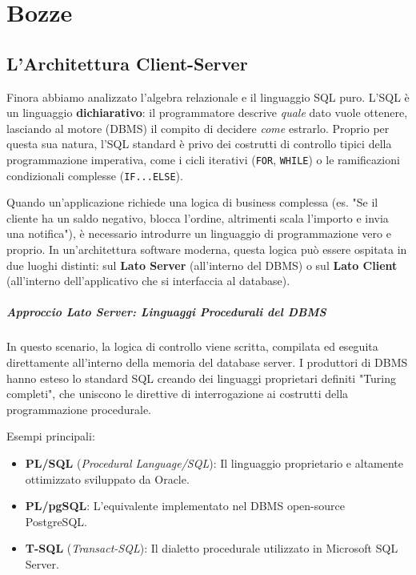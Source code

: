 \chapter{Bozze}

\section{L'Architettura Client-Server}

Finora abbiamo analizzato l'algebra relazionale e il linguaggio SQL puro. L'SQL è un linguaggio \textbf{dichiarativo}: il programmatore descrive \textit{quale} dato vuole ottenere, lasciando al motore (DBMS) il compito di decidere \textit{come} estrarlo. Proprio per questa sua natura, l'SQL standard è privo dei costrutti di controllo tipici della programmazione imperativa, come i cicli iterativi (\texttt{FOR}, \texttt{WHILE}) o le ramificazioni condizionali complesse (\texttt{IF...ELSE}).

Quando un'applicazione richiede una logica di business complessa (es. "Se il cliente ha un saldo negativo, blocca l'ordine, altrimenti scala l'importo e invia una notifica"), è necessario introdurre un linguaggio di programmazione vero e proprio. In un'architettura software moderna, questa logica può essere ospitata in due luoghi distinti: sul \textbf{Lato Server} (all'interno del DBMS) o sul \textbf{Lato Client} (all'interno dell'applicativo che si interfaccia al database).

\paragraph{Approccio Lato Server: Linguaggi Procedurali del DBMS}

In questo scenario, la logica di controllo viene scritta, compilata ed eseguita direttamente all'interno della memoria del database server. I produttori di DBMS hanno esteso lo standard SQL creando dei linguaggi proprietari definiti "Turing completi", che uniscono le direttive di interrogazione ai costrutti della programmazione procedurale.

Esempi principali:
\begin{itemize}
    \item \textbf{PL/SQL} (\textit{Procedural Language/SQL}): Il linguaggio proprietario e altamente ottimizzato sviluppato da Oracle.
    \item \textbf{PL/pgSQL}: L'equivalente implementato nel DBMS open-source PostgreSQL.
    \item \textbf{T-SQL} (\textit{Transact-SQL}): Il dialetto procedurale utilizzato in Microsoft SQL Server.
\end{itemize}


